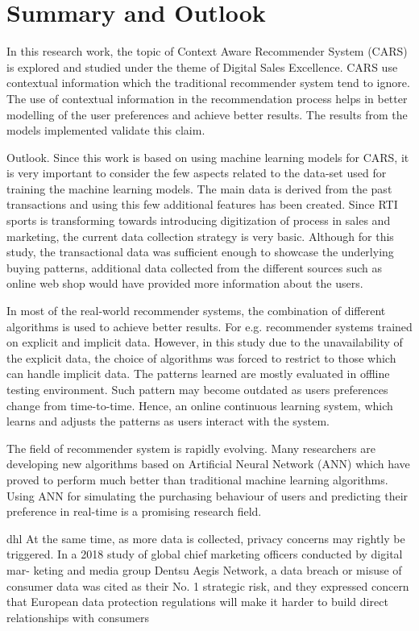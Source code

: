 \chapter{Summary and Outlook} \label{chap:chapter_8}
In this research work, the topic of Context Aware Recommender System (CARS) is explored and studied under the theme of Digital Sales Excellence. CARS use contextual information which the traditional recommender system tend to ignore. The use of contextual information in the recommendation process helps in better modelling of the user preferences and achieve better results. The results from the models implemented validate this claim. \\ \par

Outlook.
Since this work is based on using machine learning models for CARS, it is very important to consider the few aspects related to the data-set used for training the machine learning models. The main data is derived from the past transactions and using this few additional features has been created. Since RTI sports is transforming towards introducing digitization of process in sales and marketing, the current data collection strategy is very basic. Although for this study, the transactional data was sufficient enough to showcase the underlying buying patterns, additional data collected from the different sources such as online web shop would have provided more information about the users. \\ \par
In most of the real-world recommender systems, the combination of different algorithms is used to achieve better results. For e.g. recommender systems trained on explicit and implicit data. However, in this study due to the unavailability of the explicit data, the choice of algorithms was forced to restrict to those which can handle implicit data. The patterns learned are mostly evaluated in offline testing environment. Such pattern may become outdated as users preferences change from time-to-time. Hence, an online continuous learning system, which learns and adjusts the patterns as users interact with the system.\\ \par
The field of recommender system is rapidly evolving. Many researchers are developing new algorithms based on Artificial Neural Network (ANN) which have proved to perform much better than traditional machine learning algorithms. Using ANN for simulating the purchasing behaviour of users and predicting their preference in real-time is a promising research field.


dhl
At the same time, as more data is collected, privacy
concerns may rightly be triggered. In a 2018 study of global chief marketing officers conducted by digital mar- keting and media group Dentsu Aegis Network, a data breach or misuse of consumer data was cited as their No. 1 strategic risk, and they expressed concern that European data protection regulations will make it harder to build direct relationships with consumers